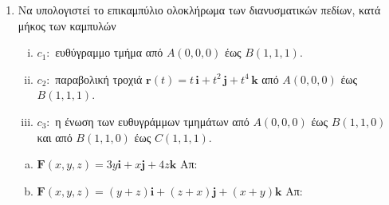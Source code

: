 




\pagestyle{askhseis}
\everymath{\displaystyle}



\begin{center}
\minibox{\large\bfseries \textcolor{Col1}{Επικαμπύλιο Ολοκλήρωμα ΙΙου είδους}}
\end{center}

\vspace{\baselineskip}

\begin{enumerate}
  \item Να υπολογιστεί το επικαμπύλιο ολοκλήρωμα των διανυσματικών πεδίων, κατά μήκος των
    καμπυλών 
    \begin{enumerate}[i)]
      \item $ c_{1} \colon $ ευθύγραμμο τμήμα από $ A(0,0,0) $ έως $ B(1,1,1) $.
      \item $ c_{2} \colon $ παραβολική τροχιά $ \mathbf{r}(t)=t\, \mathbf{i} +
        t^{2}\, \mathbf{j} + t^{4} \, \mathbf{k} $ από $ A(0,0,0) $ έως $ B(1,1,1) $.
      \item $ c_{3} \colon $ η ένωση των ευθυγράμμων τμημάτων από 
        $ A(0,0,0) $ έως $ B(1,1,0) $ και από $ B(1,1,0) $ έως $ C(1,1,1) $.
    \end{enumerate}
    \begin{enumerate}[a)]
      \item $ \mathbf{F}(x,y,z) = 3y \mathbf{i} + x \mathbf{j} + 4z \mathbf{k}
        $ \hfill Απ: 
      \item $ \mathbf{F}(x,y,z) = (y+z) \mathbf{i} + (z+x) \mathbf{j} + (x+y) \mathbf{k}
        $ \hfill Απ: 
    \end{enumerate}

\end{enumerate}

